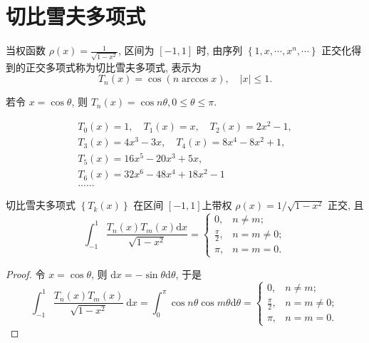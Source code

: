 \documentclass[12pt,a4paper]{article}
\begin{document}
\section{切比雪夫多项式}
	
	当权函数 $\rho(x)=\frac{1}{\sqrt{1-x^2}}$, 区间为 $[-1,1]$ 时, 由序列 $\left\{1, x, \cdots, x^n, \cdots\right\}$ 正交化得到的正交多项式称为切比雪夫多项式, 表示为
	$$
	T_n(x)=\cos (n \arccos x), \quad|x| \leq 1 .
	$$
	
	若令 $x=\cos \theta$, 则 $T_n(x)=\cos n \theta, 0 \leq \theta \leq \pi$.
	
	\begin{equation*}
		\begin{array}{cc}
		 	T_0(x)=1, \quad T_1(x)=x ,\quad T_2(x)=2 x^2-1, \\
			T_3(x)=4 x^3-3 x, \quad T_4(x)=8 x^4-8 x^2+1, \\
			T_5(x)=16 x^5-20 x^3+5 x, \\
			T_6(x)=32 x^6-48 x^4+18 x^2-1 \\
			......
		\end{array}
	\end{equation*}
	
	
	

	
	
	切比雪夫多项式 $\left\{T_k(x)\right\}$ 在区间 $[-1,1]$上带权 $\rho(x)=1 / \sqrt{1-x^2}$ 正交, 且
	$$
	\int_{-1}^1 \frac{T_n(x) T_m(x) \mathrm{d} x}{\sqrt{1-x^2}}= \begin{cases}0, & n \neq m ; \\ \frac{\pi}{2}, & n=m \neq 0 ; \\ \pi, & n=m=0 .\end{cases}
	$$
	
	\begin{proof}
		令 $x=\cos \theta$, 则 $\mathrm{d} x=-\sin \theta \mathrm{d} \theta$, 于是
		$$
		\int_{-1}^1 \frac{T_n(x) T_m(x)}{\sqrt{1-x^2}} \mathrm{~d} x=\int_0^\pi \cos n \theta \cos m \theta \mathrm{d} \theta= \begin{cases}0, & n \neq m ; \\ \frac{\pi}{2}, & n=m \neq 0 ; \\ \pi, & n=m=0 .\end{cases}
		$$
	\end{proof}
	
	
	
\end{document}
